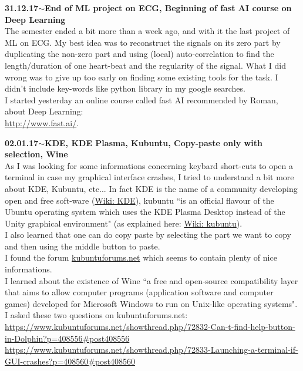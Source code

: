 \documentclass[11pt,a4paper]{article}
\newenvironment{loggentry}[2]%
{\noindent\textbf{#1}\hspace{1cm}$\mathbf{\sim}$\text{ }\textbf{#2}\\}{\vspace{0.5cm}}
\begin{document}
\begin{loggentry}{31.12.17}{End of ML project on ECG, Beginning of fast AI course on Deep Learning}
The semester ended a bit more than a week ago, and with it the last project of ML on ECG. My best idea was to reconstruct the signals on its zero part by duplicating the non-zero part and using (local) auto-correlation to find the length/duration of one heart-beat and the regularity of the signal. What I did wrong was to give up too early on finding some existing tools for the task. I didn't include key-words like python library in my google searches.\\
I started yesterday an online course called fast AI recommended by Roman, about Deep Learning:\\
\url{http://www.fast.ai/}.
\end{loggentry}

\begin{loggentry}{02.01.17}{KDE, KDE Plasma, Kubuntu, Copy-paste only with selection, Wine}
As I was looking for some informations concerning keybard short-cuts to open a terminal in case my graphical interface crashes, I tried to understand a bit more about KDE, Kubuntu, etc... In fact KDE is the name of a community developing open and free soft-ware (\href{https://en.wikipedia.org/wiki/KDE}{Wiki: KDE}), kubuntu ``is an official flavour of the Ubuntu operating system which uses the KDE Plasma Desktop instead of the Unity graphical environment" (as explained here: \href{https://en.wikipedia.org/wiki/Kubuntu}{Wiki: kubuntu}).\\
I also learned that one can do copy paste by selecting the part we want to copy and then using the middle button to paste.\\
I found the forum \href{https://www.kubuntuforums.net/forum.php}{kubuntuforums.net} which seems to contain plenty of nice informations.\\
I learned about the existence of Wine ``a free and open-source compatibility layer that aims to allow computer programs (application software and computer games) developed for Microsoft Windows to run on Unix-like operating systems".\\
I asked these two questions on kubuntuforums.net:\\
\url{https://www.kubuntuforums.net/showthread.php/72832-Can-t-find-help-button-in-Dolphin?p=408556#post408556}\\
\url{https://www.kubuntuforums.net/showthread.php/72833-Launching-a-terminal-if-GUI-crashes?p=408560#post408560}
\end{loggentry}
\end{document}
